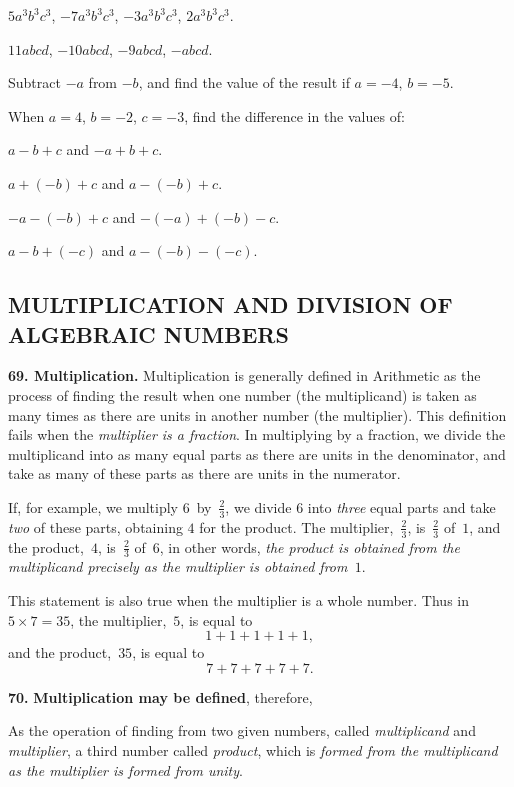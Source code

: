 \documentclass[12pt]{book}[2005/09/16]
\newcommand{\Require}[1][2\baselineskip]{%
  \setlength{\TmpLen}{\pagegoal-\pagetotal}%
  \ifthenelse{\lengthtest{0pt < \TmpLen}\and\lengthtest{\TmpLen < #1}}{%
    \vfil\newpage%
  }{}%
}
\newcommand{\Section}[1]{\subsection*{\centering\normalfont\small\scshape #1}}
\newcommand{\Paragraph}[1]{\medskip\par\textbf{#1}}
\newcommand{\Dictum}[1]{\Require\textbf{#1}}
\newcommand{\Item}[1]{\vspace{4pt plus 16pt}\makebox[1em][r]{\textbf{#1}\ }}
\newlength{\TmpLen}
\begin{document}
\Item{18.}  $5a^{3}b^{3}c^{3}$, $-7a^{3}b^{3}c^{3}$, $-3a^{3}b^{3}c^{3}$, $2a^{3}b^{3}c^{3}$.

\Item{19.}  $11abcd$, $-10abcd$, $-9abcd$, $-abcd$.

\Item{20.}  Subtract $-a$ from $-b$, and find the value of the
result if $a = -4$, $b = -5$.

When $a = 4$, $b = -2$, $c = -3$, find the difference in
the values of:

\Item{21.}  $a - b + c$ and $-a + b + c$.

\Item{22.}  $a + (-b) + c$ and $a - (-b) + c$.

\Item{23.}  $-a - (-b) + c$ and $-(-a) + (-b) - c$.

\Item{24.}  $a - b + (-c)$ and $a - (-b) - (-c)$.


\Section{MULTIPLICATION AND DIVISION OF ALGEBRAIC
NUMBERS}

\Paragraph{69.  Multiplication.}  Multiplication is generally defined
in Arithmetic as the process of finding the result when one
number (the multiplicand) is taken as many times as there
are units in another number (the multiplier).  This definition
fails when the \emph{multiplier is a fraction}.  In multiplying
by a fraction, we divide the multiplicand into as many
equal parts as there are units in the denominator, and take
as many of these parts as there are units in the numerator.

If, for example, we multiply $6$~by~$\frac{2}{3}$, we divide $6$ into
\emph{three} equal parts and take \emph{two} of these parts, obtaining $4$
for the product.  The multiplier,~$\frac{2}{3}$, is~$\frac{2}{3}$ of~$1$, and the
product,~$4$, is~$\frac{2}{3}$ of~$6$, in other words, \emph{the product is obtained
from the multiplicand precisely as the multiplier is obtained
from~$1$}.

This statement is also true when the multiplier is a whole
number.  Thus in $5 × 7 = 35$, the multiplier,~$5$, is equal to
\[
1 + 1 + 1 + 1 + 1,
\]
and the product,~$35$, is equal to
\[
7 + 7 + 7 + 7 + 7.
\]

\Paragraph{70.}  \Dictum{Multiplication may be defined}, therefore,

As the operation of finding from two given numbers,
called \emph{multiplicand} and \emph{multiplier}, a third number called
\emph{product}, which is \emph{formed from the multiplicand as the multiplier
is formed from unity}.
\end{document}
